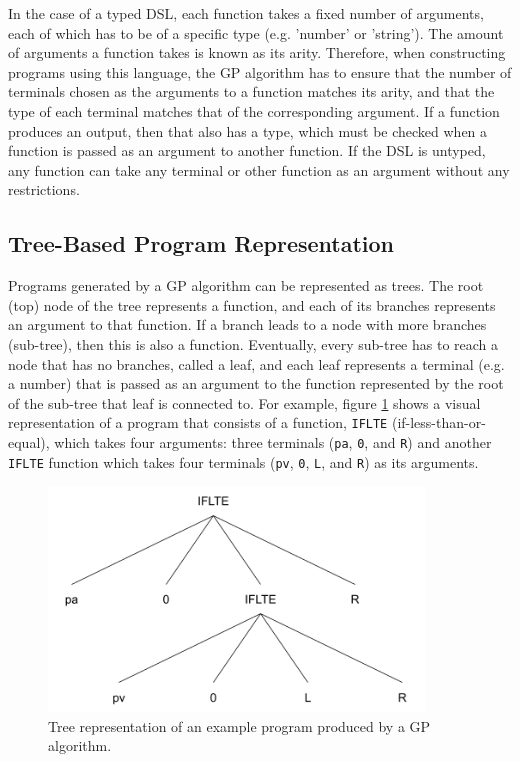 In the case of a typed DSL, each function takes a fixed number of arguments, each of which has to be of a specific type (e.g. 'number' or 'string'). The amount of arguments a function takes is known as its arity. Therefore, when constructing programs using this language, the GP algorithm has to ensure that the number of terminals chosen as the arguments to a function matches its arity, and that the type of each terminal matches that of the corresponding argument. If a function produces an output, then that also has a type, which must be checked when a function is passed as an argument to another function. If the DSL is untyped, any function can take any terminal or other function as an argument without any restrictions.

\subsection{Tree-Based Program Representation}
Programs generated by a GP algorithm can be represented as trees. The root (top) node of the tree represents a function, and each of its branches represents an argument to that function. If a branch leads to a node with more branches (sub-tree), then this is also a function. Eventually, every sub-tree has to reach a node that has no branches, called a leaf, and each leaf represents a terminal (e.g. a number) that is passed as an argument to the function represented by the root of the sub-tree that leaf is connected to. For example, figure \ref{fig:example_program_tree} shows a visual representation of a program that consists of a function, \verb+IFLTE+ (if-less-than-or-equal), which takes four arguments: three terminals (\verb+pa+, \verb+0+, and \verb+R+) and another \verb+IFLTE+ function which takes four terminals (\verb+pv+, \verb+0+, \verb+L+, and \verb+R+) as its arguments.

\begin{figure}[ht]
    \centering
    \includegraphics[width=10cm]{images/complex_iflte_program.png}
    \caption{Tree representation of an example program produced by a GP algorithm.}
    \label{fig:example_program_tree}
\end{figure}

